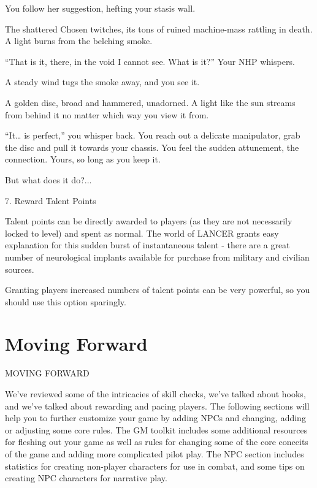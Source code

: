 You follow her suggestion, hefting your stasis wall.

The shattered Chosen twitches, its tons of ruined machine-mass rattling in death. A light burns
from the belching smoke.

“That is it, there, in the void I cannot see. What is it?” Your NHP whispers.

A steady wind tugs the smoke away, and you see it.

A golden disc, broad and hammered, unadorned. A light like the sun streams from behind it no
matter which way you view it from.

“It… is perfect,” you whisper back. You reach out a delicate manipulator, grab the disc and pull it
towards your chassis. You feel the sudden attunement, the connection. Yours, so long as you
keep it.

But what does it do?...

7. Reward Talent Points

Talent points can be directly awarded to players (as they are not necessarily locked to level) and
spent as normal. The world of LANCER grants easy explanation for this sudden burst of
instantaneous talent - there are a great number of neurological implants available for purchase
from military and civilian sources.





Granting players increased numbers of talent points can be very powerful, so you should use this
option sparingly.

\chapter{Moving Forward}
                                       MOVING FORWARD

We’ve reviewed some of the intricacies of skill checks, we’ve talked about hooks, and we’ve
talked about rewarding and pacing players. The following sections will help you to further
customize your game by adding NPCs and changing, adding or adjusting some core rules.
The GM toolkit includes some additional resources for fleshing out your game as well as rules
for changing some of the core conceits of the game and adding more complicated pilot play. The
NPC section includes statistics for creating non-player characters for use in combat, and some
tips on creating NPC characters for narrative play.





